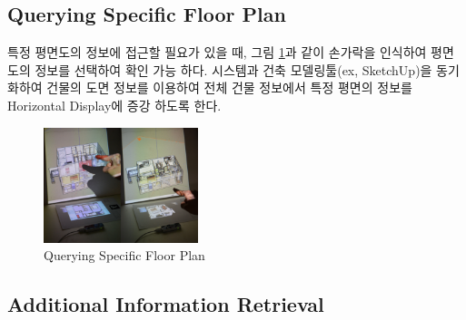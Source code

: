 \subsection{Querying Specific Floor Plan}
특정 평면도의 정보에 접근할 필요가 있을 때, 그림 \ref{fig:layer}과 같이 손가락을 인식하여 평면도의 정보를 선택하여 확인 가능 하다. 시스템과 건축 모델링툴(ex, SketchUp)을 동기화하여 건물의 도면 정보를 이용하여 전체 건물 정보에서 특정 평면의 정보를 Horizontal Display에 증강 하도록 한다. 
 \begin{figure}[h!]
\centering
\includegraphics[width=0.4\textwidth]{4-Interaction_Design/query_plane}
\caption{Querying Specific Floor Plan}
\label{fig:layer}
\end{figure}


\subsection{Additional Information Retrieval}

